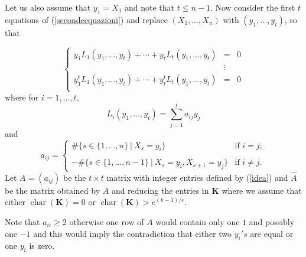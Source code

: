 \documentclass[a4paper,twoside]{article}
\begin{document}
Let us also assume that $y_1=X_1$ and note that $t\leq n-1$.
Now consider the first $t$ equations of (\ref{secondeequazioni})
and replace $(X_1,\ldots,X_n)$ with
 $(y_1,\ldots,y_t)$, so that

\begin{equation}\label{newrels}\left\{\begin{array}{lcr}
y_1L_1(y_1,\ldots,y_t)+\cdots+y_tL_t(y_1,\ldots,y_t) &=&0\\
&\vdots&\\
y_1^tL_1(y_1,\ldots,y_t)+\cdots+y_t^tL_t(y_1,\ldots,y_t) &=&0\\
\end{array}
\right.\end{equation}
where for $i=1,\ldots,t$,
$$L_i(y_1,\ldots,y_t)=\sum_{j=1}^t a_{ij}y_j$$
and
\begin{equation}\label{idea}
a_{ij}=\left\{
\begin{array}{lr}
 \#\{s\in\{1,\ldots,n\}\ |\ X_s=y_i\} & \text{if } i=j;\\
\\
-  \#\{s\in\{1,\ldots,n-1\}\ |\ X_s=y_i, X_{s+1}=y_j\} & \text{if } i\neq j.
\end{array}
\right.
\end{equation}
Let $A=(a_{ij})$ be the $t\times t$ matrix with integer entries defined by
(\ref{idea}) and $\hat{A}$ be the matrix obtained by $A$ and reducing
the entries in $\mathbf K$ where we assume that either $\operatorname{char}(\mathbf K)=0$ or $\operatorname{char}(\mathbf K)>e^{(k-3)/e}$.

Note that $a_{ii}\geq2$ otherwise one
row of $A$ would contain only one $1$ and possibly one $-1$ and this
would imply the contradiction that either two $y_i's$ are equal
or one $y_i$ is zero.
\end{document}
